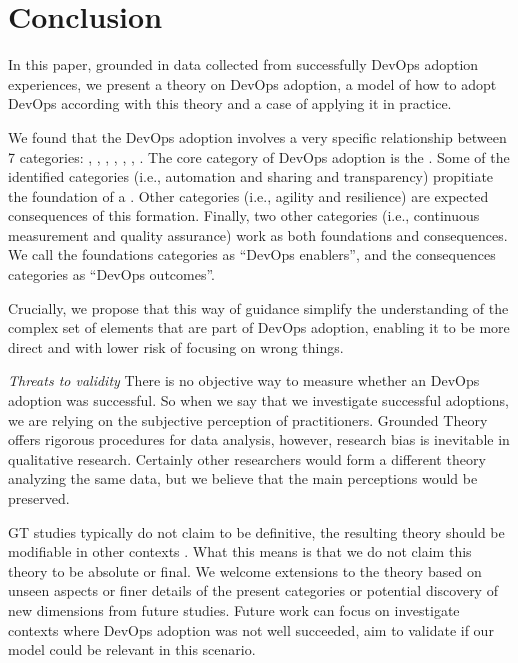 \section{Conclusion} \label{sec:conclusion}

In this paper, grounded in data collected from successfully DevOps adoption
experiences, we present a theory on DevOps adoption, a model of how to adopt
DevOps according with this theory and a case of applying it in practice.

We found that the DevOps adoption involves a very specific relationship between
7 categories: , , \cc, , , , .
The core category of DevOps adoption is the \cc. Some of the
identified categories (i.e., automation and sharing and transparency) propitiate
the foundation of a \cc. Other categories
(i.e., agility and resilience) are expected consequences of this formation.
Finally, two other categories (i.e., continuous measurement and quality
assurance) work as both foundations and consequences. We call the foundations
categories as ``DevOps enablers'', and the consequences categories as ``DevOps outcomes''.

Crucially, we propose that this way of guidance simplify the understanding of the
complex set of elements that are part of DevOps adoption, enabling it to be
more direct and with lower risk of focusing on wrong things.

\emph{Threats to validity} There is no objective way to measure whether an
DevOps adoption was successful. So when we say that we investigate successful
adoptions, we are relying on the subjective perception of practitioners. Grounded
Theory offers rigorous procedures for data analysis, however, research
bias is inevitable in qualitative research. Certainly other researchers would
form a different theory analyzing the same data, but we believe that the main perceptions
would be preserved.

GT studies typically do not claim to be definitive, the resulting theory should
be modifiable in other contexts \cite{hoda2012developing}. What this means is that we do not claim
this theory to be absolute or final. We welcome extensions to the theory based
on unseen aspects or finer details of the present categories or potential discovery
of new dimensions from future studies. Future work can focus on investigate contexts
where DevOps adoption was not well succeeded, aim to validate if our model could be
relevant in this scenario.
